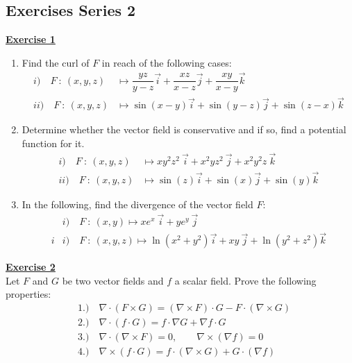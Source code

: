 \subsection{Exercises Series 2}
\vspace*{0.2cm}
\Large{\underline{\textbf{Exercise 1}}}
\normalsize{}
\begin{enumerate}
    \item Find the curl of $F$ in reach of the following cases:
    \begin{align*}
        i)\quad  F\ :\ (x,y,z) &\longmapsto 
                        \dfrac{yz}{y - z}\vec{i} + \dfrac{xz}{x - z}\vec{j} + \dfrac{xy}{x - y}\vec{k}\\
        ii)\quad  F\ :\ (x,y,z) &\longmapsto 
                        \sin(x - y)\vec{i} + \sin(y - z)\vec{j} + \sin(z - x)\vec{k}
    \end{align*}
    \item Determine whether the vector field is conservative and if so, find a potential function for it.
    \begin{align*}
        i)\quad  F\ :\ (x,y,z) &\longmapsto 
                                    xy^2z^2\ \vec{i} + x^2yz^2\ \vec{j} + x^2y^2z\ \vec{k}\\
        ii)\quad  F\ :\ (x,y,z) &\longmapsto 
                                    \sin(z)\vec{i} + \sin(x)\vec{j} + \sin(y)\vec{k}
    \end{align*}
    \item In the following, find the divergence of the vector field $F$:
    \begin{align*}
        &i)\quad  F\ :\ (x,y) \longmapsto xe^x\ \vec{i} + ye^y\ \vec{j}\\
        i&i)\quad  F\ :\ (x,y,z) \longmapsto \ln(x^2 + y^2)\vec{i} + xy\ \vec{j} + \ln(y^2 + z^2)\vec{k}
    \end{align*}
\end{enumerate}
\vspace*{0.34cm}
\Large{\underline{\textbf{Exercise 2}}}
\normalsize{}\\
\noindent Let $F$ and $G$ be two vector fields and $f$ a scalar field. Prove the following properties:
    \begin{align*}
        &1.) \quad \nabla\cdot(F\times G) = (\nabla\times F)\cdot G - F\cdot(\nabla\times G) \\
        &2.) \quad \nabla\cdot(f\cdot G) = f\cdot \nabla G + \nabla f \cdot G \\
        &3.) \quad \nabla\cdot(\nabla\times F) = 0, \qquad \nabla\times(\nabla f) = 0 \\
        &4.) \quad \nabla\times(f\cdot G) = f\cdot (\nabla\times G) + G\cdot (\nabla f)
    \end{align*}
